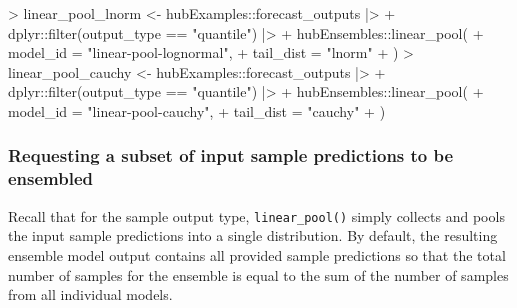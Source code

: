 \documentclass[
]{article}
\newenvironment{Shaded}{\begin{snugshade}}{\end{snugshade}}
\newcommand{\AttributeTok}[1]{\textcolor[rgb]{0.40,0.45,0.13}{#1}}
\newcommand{\FunctionTok}[1]{\textcolor[rgb]{0.28,0.35,0.67}{#1}}
\newcommand{\NormalTok}[1]{\textcolor[rgb]{0.00,0.23,0.31}{#1}}
\newcommand{\OtherTok}[1]{\textcolor[rgb]{0.00,0.23,0.31}{#1}}
\newcommand{\SpecialCharTok}[1]{\textcolor[rgb]{0.37,0.37,0.37}{#1}}
\newcommand{\StringTok}[1]{\textcolor[rgb]{0.13,0.47,0.30}{#1}}
\begin{document}
\begin{Shaded}
\begin{Highlighting}[]
\SpecialCharTok{\textgreater{}}\NormalTok{ linear\_pool\_lnorm }\OtherTok{\textless{}{-}}\NormalTok{ hubExamples}\SpecialCharTok{::}\NormalTok{forecast\_outputs }\SpecialCharTok{|\textgreater{}}
\SpecialCharTok{+}\NormalTok{   dplyr}\SpecialCharTok{::}\FunctionTok{filter}\NormalTok{(output\_type }\SpecialCharTok{==} \StringTok{"quantile"}\NormalTok{) }\SpecialCharTok{|\textgreater{}}
\SpecialCharTok{+}\NormalTok{   hubEnsembles}\SpecialCharTok{::}\FunctionTok{linear\_pool}\NormalTok{(}
\SpecialCharTok{+}     \AttributeTok{model\_id =} \StringTok{"linear{-}pool{-}lognormal"}\NormalTok{,}
\SpecialCharTok{+}     \AttributeTok{tail\_dist =} \StringTok{"lnorm"}
\SpecialCharTok{+}\NormalTok{   )}
\SpecialCharTok{\textgreater{}}\NormalTok{ linear\_pool\_cauchy }\OtherTok{\textless{}{-}}\NormalTok{ hubExamples}\SpecialCharTok{::}\NormalTok{forecast\_outputs }\SpecialCharTok{|\textgreater{}}
\SpecialCharTok{+}\NormalTok{   dplyr}\SpecialCharTok{::}\FunctionTok{filter}\NormalTok{(output\_type }\SpecialCharTok{==} \StringTok{"quantile"}\NormalTok{) }\SpecialCharTok{|\textgreater{}}
\SpecialCharTok{+}\NormalTok{   hubEnsembles}\SpecialCharTok{::}\FunctionTok{linear\_pool}\NormalTok{(}
\SpecialCharTok{+}     \AttributeTok{model\_id =} \StringTok{"linear{-}pool{-}cauchy"}\NormalTok{,}
\SpecialCharTok{+}     \AttributeTok{tail\_dist =} \StringTok{"cauchy"}
\SpecialCharTok{+}\NormalTok{   )}
\end{Highlighting}
\end{Shaded}

\subsubsection{Requesting a subset of input sample predictions to be
ensembled}\label{requesting-a-subset-of-input-sample-predictions-to-be-ensembled}

Recall that for the sample output type, \texttt{linear\_pool()} simply
collects and pools the input sample predictions into a single
distribution. By default, the resulting ensemble model output contains
all provided sample predictions so that the total number of samples for
the ensemble is equal to the sum of the number of samples from all
individual models.
\end{document}
